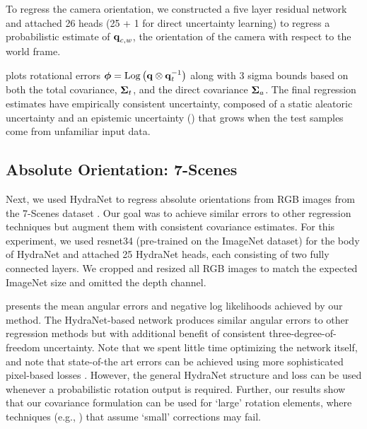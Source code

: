 To regress the camera orientation, we constructed a five layer residual network and attached 26 heads (25 + 1 for direct uncertainty learning) to regress a probabilistic estimate of $\boldsymbol{\mathbf{q}}_{c,w}$, the orientation of the camera with respect to the world frame.

 plots rotational errors $\boldsymbol{\mathbf{\phi}} = \mathrm{Log}\left({\boldsymbol{\mathbf{q}} \otimes \boldsymbol{\mathbf{q}}_t^{-1}}\right)$  along with 3 sigma bounds based on both the total covariance, $\boldsymbol{\mathbf{\Sigma}}_t$, and the direct covariance $\boldsymbol{\mathbf{\Sigma}}_a$. The final regression estimates have empirically consistent uncertainty, composed of a static aleatoric uncertainty  and an epistemic uncertainty () that grows when the test samples come from unfamiliar input data.

\subsection{Absolute Orientation: 7-Scenes}
Next, we used HydraNet to regress absolute orientations from RGB images from the 7-Scenes dataset \citep{Glocker7scenes}. Our goal was to achieve similar errors to other regression techniques \citep{Kendall2017-ud} but augment them with consistent covariance estimates. For this experiment, we used \textsf{resnet34} \citep{he2016deep} (pre-trained on the ImageNet dataset) for the body of HydraNet and attached 25 HydraNet heads, each consisting of two fully connected layers. We cropped and resized all RGB images to match the expected ImageNet size and omitted the depth channel.

 presents the mean angular errors and negative log likelihoods achieved by our method. The HydraNet-based network produces similar angular errors to other regression methods \citep{Kendall2017-ud} but with additional benefit of consistent three-degree-of-freedom uncertainty. Note that we spent little time optimizing the network itself, and note that state-of-the art errors can be achieved using more sophisticated pixel-based losses \citep{Brachmann2018-us}. However, the general HydraNet structure and loss can be used whenever a probabilistic rotation output is required. Further, our results show that our covariance formulation can be used for `large' rotation elements, where techniques (e.g., \citep{2018_Peretroukhin_Deep}) that assume `small' corrections may fail.

